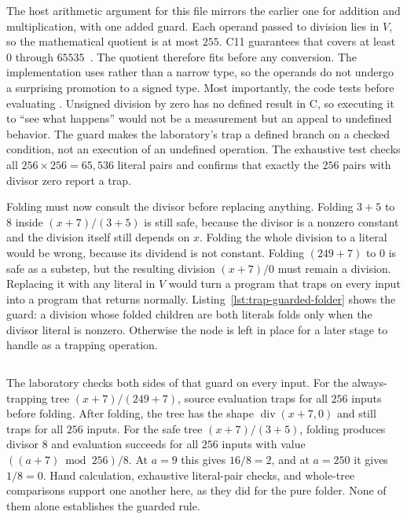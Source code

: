 The host arithmetic argument for this file mirrors the earlier one for addition and multiplication, with one added guard.
Each operand passed to division lies in $V$, so the mathematical quotient is at most $255$.
C11 guarantees that  covers at least $0$ through $65535$~\cite[Section~5.2.4.2.1]{wg14-2011-c11}.
The quotient therefore fits before any conversion.
The implementation uses  rather than a narrow type, so the operands do not undergo a surprising promotion to a signed type.
Most importantly, the code tests  before evaluating .
Unsigned division by zero has no defined result in C, so executing it to \enquote{see what happens} would not be a measurement but an appeal to undefined behavior.
The guard makes the laboratory's trap a defined branch on a checked condition, not an execution of an undefined operation.
The exhaustive test checks all $256\times256=65{,}536$ literal pairs and confirms that exactly the $256$ pairs with divisor zero report a trap.

Folding must now consult the divisor before replacing anything.
Folding $3+5$ to $8$ inside $(x+7)/(3+5)$ is still safe, because the divisor is a nonzero constant and the division itself still depends on $x$.
Folding the whole division to a literal would be wrong, because its dividend is not constant.
Folding $(249+7)$ to $0$ is safe as a substep, but the resulting division $(x+7)/0$ must remain a division.
Replacing it with any literal in $V$ would turn a program that traps on every input into a program that returns normally.
Listing~\ref{lst:trap-guarded-folder} shows the guard: a division whose folded children are both literals folds only when the divisor literal is nonzero.
Otherwise the node is left in place for a later stage to handle as a trapping operation.

\begin{listing}
  \inputminted[firstline=50,lastline=70]{c}{example-code/ch01/trap_lab.c}
  \caption{A division by a folded zero divisor is left unfolded.}
  \label{lst:trap-guarded-folder}
\end{listing}

The laboratory checks both sides of that guard on every input.
For the always-trapping tree $(x+7)/(249+7)$, source evaluation traps for all $256$ inputs before folding.
After folding, the tree has the shape $\operatorname{div}(x+7,0)$ and still traps for all $256$ inputs.
For the safe tree $(x+7)/(3+5)$, folding produces divisor $8$ and evaluation succeeds for all $256$ inputs with value $((a+7)\bmod256)/8$.
At $a=9$ this gives $16/8=2$, and at $a=250$ it gives $1/8=0$.
Hand calculation, exhaustive literal-pair checks, and whole-tree comparisons support one another here, as they did for the pure folder.
None of them alone establishes the guarded rule.

